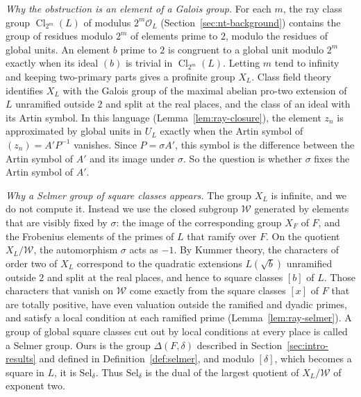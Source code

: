 \documentclass[11pt]{article}
\theoremstyle{plain}
\theoremstyle{definition}
\theoremstyle{remark}
\DeclareMathOperator{\Cl}{Cl}
\newcommand{\OO}{\mathcal O}
\begin{document}
\emph{Why the obstruction is an element of a Galois group.}  For each $m$,
the ray class group $\Cl_{2^m}(L)$ of modulus $2^m\OO_L$
(Section~\ref{sec:nt-background}) contains the group of residues modulo
$2^m$ of elements prime to $2$, modulo the residues of global units.  An
element $b$ prime to $2$ is congruent to a global unit modulo $2^m$
exactly when its ideal $(b)$ is trivial in $\Cl_{2^m}(L)$.  Letting $m$
tend to infinity and keeping two-primary parts gives a profinite group
$X_L$.  Class field theory identifies $X_L$ with the Galois group of the
maximal abelian pro-two extension of $L$ unramified outside $2$ and split
at the real places, and the class of an ideal with its Artin symbol.  In
this language (Lemma~\ref{lem:ray-closure}), the element $z_n$ is
approximated by global units in $U_L$ exactly when the Artin symbol of
$(z_n)=A'P^{-1}$ vanishes.  Since $P=\sigma A'$, this symbol is the
difference between the Artin symbol of $A'$ and its image under $\sigma$.
So the question is whether $\sigma$ fixes the Artin symbol of $A'$.

\emph{Why a Selmer group of square classes appears.}  The group $X_L$ is
infinite, and we do not compute it.  Instead we use the closed subgroup
$\mathcal W$ generated by elements that are visibly fixed by $\sigma$:
the image of the corresponding group $X_F$ of $F$, and the Frobenius
elements of the primes of $L$ that ramify over $F$.  On the quotient
$X_L/\mathcal W$, the automorphism $\sigma$ acts as $-1$.  By Kummer
theory, the characters of order two of $X_L$ correspond to the quadratic
extensions $L(\sqrt b)$ unramified outside $2$ and split at the real
places, and hence to square classes $[b]$ of $L$.  Those characters that
vanish on $\mathcal W$ come exactly from the square classes $[x]$ of $F$
that are totally positive, have even valuation outside the ramified and
dyadic primes, and satisfy a local condition at each ramified prime
(Lemma~\ref{lem:ray-selmer}).  A group of global square classes cut out
by local conditions at every place is called a Selmer group.  Ours is
the group $\Delta(F,\delta)$ described in Section~\ref{sec:intro-results}
and defined in Definition~\ref{def:selmer}, and
modulo $[\delta]$, which becomes a square in $L$, it is
$\mathrm{Sel}_\delta$.  Thus $\mathrm{Sel}_\delta$ is the dual of the
largest quotient of $X_L/\mathcal W$ of exponent two.
\end{document}

